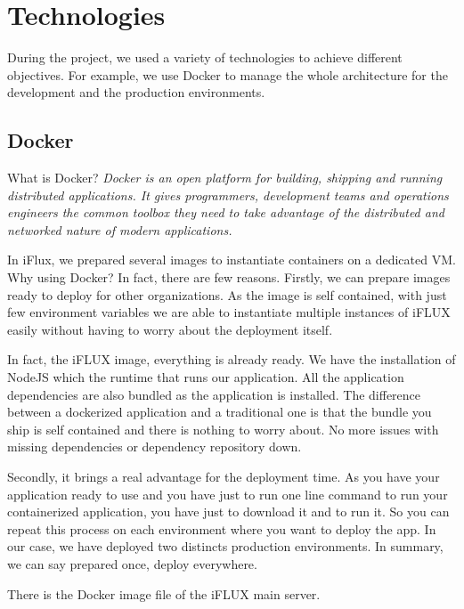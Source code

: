 \section{Technologies}

During the project, we used a variety of technologies to achieve different objectives. For example, we use Docker to manage the whole architecture for the development and the production environments.

\subsection{Docker}

What is Docker? \emph{Docker is an open platform for building, shipping and running distributed applications. It gives programmers, development teams and operations engineers the common toolbox they need to take advantage of the distributed and networked nature of modern applications.}

In iFlux, we prepared several images to instantiate containers on a dedicated VM. Why using Docker? In fact, there are few reasons. Firstly, we can prepare images ready to deploy for other organizations. As the image is self contained, with just few environment variables we are able to instantiate multiple instances of iFLUX easily without having to worry about the deployment itself.

In fact, the iFLUX image, everything is already ready. We have the installation of NodeJS which the runtime that runs our application. All the application dependencies are also bundled as the application is installed. The difference between a dockerized application and a traditional one is that the bundle you ship is self contained and there is nothing to worry about. No more issues with missing dependencies or dependency repository down.

Secondly, it brings a real advantage for the deployment time. As you have your application ready to use and you have just to run one line command to run your containerized application, you have just to download it and to run it. So you can repeat this process on each environment where you want to deploy the app. In our case, we have deployed two distincts production environments. In summary, we can say prepared once, deploy everywhere.

There is the Docker image file of the iFLUX main server.

